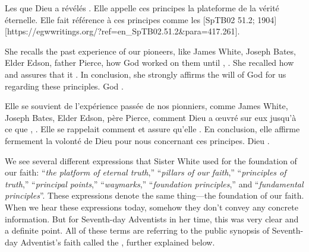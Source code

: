 Les  que Dieu a révélés . Elle appelle ces principes la plateforme de la vérité éternelle. Elle fait référence à ces principes comme les [SpTB02 51.2; 1904][https://egwwritings.org/?ref=en\_SpTB02.51.2&para=417.261].


She recalls the past experience of our pioneers, like James White, Joseph Bates, Elder Edson, father Pierce, how God worked on them until , . She recalled how  and assures that it . In conclusion, she strongly affirms the will of God for us regarding these principles. God .


Elle se souvient de l'expérience passée de nos pionniers, comme James White, Joseph Bates, Elder Edson, père Pierce, comment Dieu a œuvré sur eux jusqu'à ce que , . Elle se rappelait comment  et assure qu'elle . En conclusion, elle affirme fermement la volonté de Dieu pour nous concernant ces principes. Dieu .


We see several different expressions that Sister White used for the foundation of our faith: “\textit{the platform of eternal truth},” “\textit{pillars of our faith},” “\textit{principles of truth},” “\textit{principal points},” “\textit{waymarks},” “\textit{foundation principles},” and “\textit{fundamental principles}”. These expressions denote the same thing—the foundation of our faith. When we hear these expressions today, somehow they don’t convey any concrete information. But for Seventh-day Adventists in her time, this was very clear and a definite point. All of these terms are referring to the public synopsis of Seventh-day Adventist’s faith called the , further explained below.


